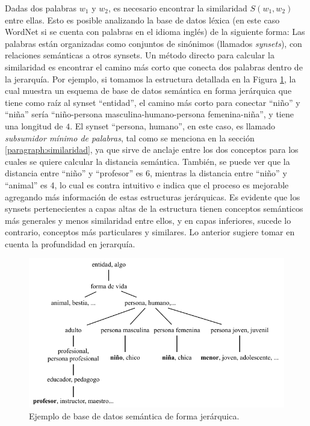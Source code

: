 \bigskip Dadas dos palabras \(w_1\) y \(w_2\), es necesario encontrar la similaridad \(S(w_1,w_2)\) entre ellas. Esto es posible analizando la base de datos léxica (en este caso WordNet si se cuenta con palabras en el idioma inglés) de la siguiente forma: Las palabras están organizadas como conjuntos de sinónimos (llamados \textit{synsets}), con relaciones semánticas a otros synsets. Un método directo para calcular la similaridad es encontrar el camino más corto que conecta dos palabras dentro de la jerarquía. Por ejemplo, si tomamos la estructura detallada en la Figura \ref{fig:taxonomiasemantica}, la cual muestra un esquema de base de datos semántica en forma jerárquica que tiene como raíz al synset ``entidad'', el camino más corto para conectar ``niño'' y ``niña'' sería ``niño-persona masculina-humano-persona femenina-niña'', y tiene una longitud de \(4\). El synset ``persona, humano'', en este caso, es llamado \textit{subsumidor mínimo de palabras}, tal como se menciona en la sección \ref{paragraph:similaridad}, ya que sirve de anclaje entre los dos conceptos para los cuales se quiere calcular la distancia semántica. También, se puede ver que la distancia entre ``niño'' y ``profesor'' es 6, mientras la distancia entre ``niño'' y ``animal'' es 4, lo cual es contra intuitivo e indica que el proceso es mejorable agregando más información de estas estructuras jerárquicas. Es evidente que los synsets pertenecientes a capas altas de la estructura tienen conceptos semánticos más generales y menos similaridad entre ellos, y en capas inferiores, sucede lo contrario, conceptos más particulares y similares. Lo anterior sugiere tomar en cuenta la profundidad en jerarquía.

\begin{figure}[h!]
	\centering
	\includegraphics[width=0.9\linewidth]{7_marco_teorico/imagenes/taxonomia_semantica}
	\caption{Ejemplo de base de datos semántica de forma jerárquica.}
	\label{fig:taxonomiasemantica}
\end{figure}

